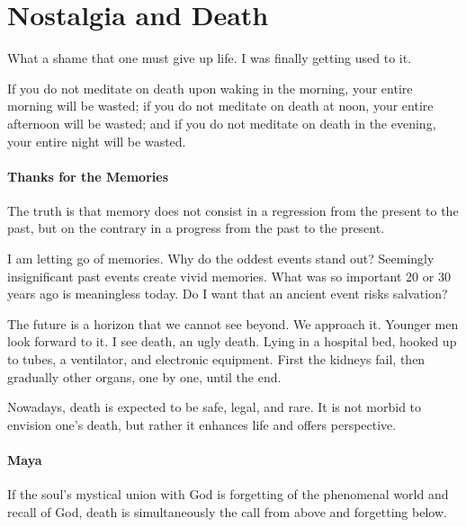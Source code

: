 \section{Nostalgia and Death}

\begin{quotex}
What a shame that one must give up life. I was finally getting used to it.

If you do not meditate on death upon waking in the morning, your entire morning will be wasted; if you do not meditate on death at noon, your entire afternoon will be wasted; and if you do not meditate on death in the evening, your entire night will be wasted.
\end{quotex}


\paragraph{Thanks for the Memories}


\begin{quotex}
The truth is that memory does not consist in a regression from the present to the past, but on the contrary in a progress from the past to the present.
\end{quotex}


I am letting go of memories. Why do the oddest events stand out? Seemingly insignificant past events create vivid memories. What was so important 20 or 30 years ago is meaningless today. Do I want that an ancient event risks salvation?

The future is a horizon that we cannot see beyond. We approach it. Younger men look forward to it. I see death, an ugly death. Lying in a hospital bed, hooked up to tubes, a ventilator, and electronic equipment. First the kidneys fail, then gradually other organs, one by one, until the end.

Nowadays, death is expected to be safe, legal, and rare. It is not morbid to envision one's death, but rather it enhances life and offers perspective.

\paragraph{Maya}


\begin{quotex}
If the soul's mystical union with God is forgetting of the phenomenal world and recall of God, death is simultaneously the call from above and forgetting below.
\end{quotex}


